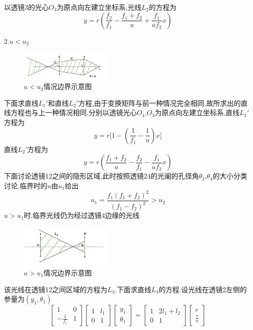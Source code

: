 \documentclass[UTF8]{gapd}
\begin{document}
以透镜3的光心$O_3$为原点向左建立坐标系,光线$L_2$的方程为
\begin{equation}
  y=r(\frac{f_2}{f_1}-\frac{f_1+f_2}{u}+\frac{f_1}{uf_2}x   )
\end{equation}

2.$u<u_2$
\begin{figure}
  \centering
  \includegraphics[width=0.4\textwidth]{images/7.jpg}
  \caption{$u<u_2$情况边界示意图}
  \label{fig:7}
\end{figure}
下面求直线$L_1'$和直线$L_2'$方程,由于变换矩阵与前一种情况完全相同,故所求出的直线方程也与上一种情况相同,分别以透镜光心$O_4$,$O_3$为原点向左建立坐标系,直线$L_1'$方程为
\begin{equation}
  y=r\big[1-(\frac{1}{f_1} -\frac{1}{u} )x\big]
\end{equation}
直线$L_2'$方程为
\begin{equation}
  y=r(\frac{f_1+f_2}{u}-\frac{f_2}{f_1}-\frac{f_1}{uf_2}x   )
\end{equation}
下面讨论透镜12之间的隐形区域,此时按照透镜24的光阑的孔径角$\theta_2$,$\theta_4$的大小分类讨论,临界时的$u$由$u_1$给出
\begin{equation}
  u_1=\frac{f_1(f_1+f_2)^2}{(f_1-f_2)^2} >u_2
\end{equation}
$u>u_1$时,临界光线仍为经过透镜4边缘的光线
\begin{figure}
  \centering
  \includegraphics[width=0.4\textwidth]{images/8.jpg}
  \caption{$u>u_1$情况边界示意图}
\end{figure}
该光线在透镜12之间区域的方程为$L_3$,下面求直线$L_3$的方程.设光线在透镜2左侧的参量为$(y_1,\theta_1 )$
\begin{equation}
  \begin{bmatrix}
      1 & 0\\
      -\frac{1}{f_1} & 1
  \end{bmatrix}
  \begin{bmatrix}
      1&l_1\\
      0&1
  \end{bmatrix}
  \begin{bmatrix}
      y_1\\
      \theta_1
  \end{bmatrix}=
  \begin{bmatrix}
      1 & 2l_1+l_2\\
     0 & 1
  \end{bmatrix}
  \begin{bmatrix}
      r\\
      \frac{r}{u} 
  \end{bmatrix}
\end{equation}
\end{document}
